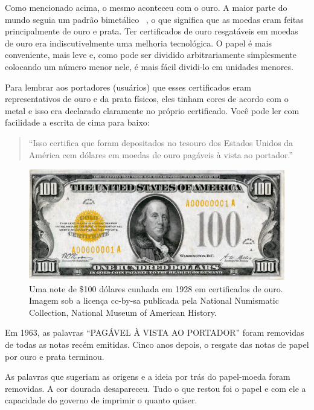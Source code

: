 Como mencionado acima, o mesmo aconteceu com o ouro. A maior parte do mundo seguia um padrão bimetálico ~\cite {wiki:bimetallism}, o que significa que as moedas eram feitas principalmente de ouro e prata. Ter certificados de ouro resgatáveis em moedas de ouro era indiscutivelmente uma melhoria tecnológica. O papel é mais conveniente, mais leve e, como pode ser dividido arbitrariamente simplesmente colocando um número menor nele, é mais fácil dividi-lo em unidades menores.

Para lembrar aos portadores (usuários) que esses certificados eram representativos de ouro e da prata físicos, eles tinham cores de acordo com o metal e isso era declarado claramente no próprio certificado. Você pode ler com facilidade a escrita de cima para baixo:

\begin{quotation}\begin{samepage}
\enquote{Isso certifica que foram depositados no tesouro dos Estados Unidos da América cem dólares em moedas de ouro pagáveis à vista ao portador.}
\end{samepage}\end{quotation}

\begin{figure}
  \centering
  \includegraphics{assets/images/us-gold-cert-100-smaller.png}
  \caption{Uma note de \$100 dólares cunhada em 1928 em certificados de ouro. Imagem sob a licença cc-by-sa publicada pela National Numismatic Collection, National Museum of American History.}
  \label{fig:us-gold-cert-100-smaller}
\end{figure}

Em 1963, as palavras \enquote{PAGÁVEL À VISTA AO PORTADOR} foram removidas de todas as notas recém emitidas. Cinco anos depois, o resgate das notas de papel por ouro e prata terminou.

As palavras que sugeriam as origens e a ideia por trás do papel-moeda foram removidas. A cor dourada desapareceu. Tudo o que restou foi o papel e com ele a capacidade do governo de imprimir o quanto quiser.

